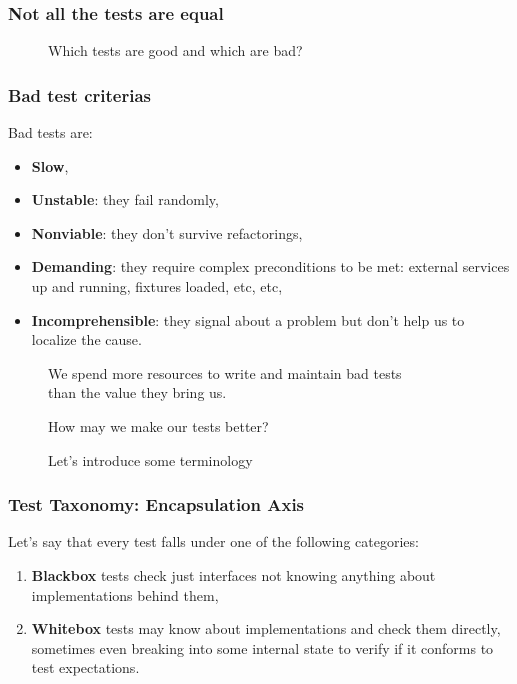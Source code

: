 \documentclass[usenames,dvipsnames,aspectratio=169]{beamer}
\begin{document}
\begin{frame}
  \frametitle{Not all the tests are equal}

  \begin{figure}
  \Huge Which tests are good and which are bad?
  \end{figure}
\end{frame}

\begin{frame}
  \frametitle{Bad test criterias}

  Bad tests are:
  \begin{itemize}
    \item \textbf{Slow},
    \item \textbf{Unstable}: they fail randomly,
    \item \textbf{Nonviable}: they don’t survive refactorings,
    \item \textbf{Demanding}: they require complex preconditions to be met: external services up and running, fixtures loaded, etc, etc,
    \item \textbf{Incomprehensible}: they signal about a problem but don’t help us to localize the cause.
  \end{itemize}
\end{frame}

\begin{frame}
  \begin{figure}
  \Huge We spend more resources to write and maintain bad tests \\
  than the value they bring us.
  \end{figure}
\end{frame}

\begin{frame}
  \begin{figure}
  \Huge How may we make our tests better?
  \end{figure}
\end{frame}

\begin{frame}
  \begin{figure}
  \Huge Let's introduce some terminology
  \end{figure}
\end{frame}

\begin{frame}
  \frametitle{Test Taxonomy: Encapsulation Axis}
  Let's say that every test falls under one of the following categories:

  \begin{enumerate}
    \item \textbf{Blackbox} tests check just interfaces not knowing anything about implementations behind them,
    \item \textbf{Whitebox} tests may know about implementations and check them directly, sometimes even breaking into some internal state to verify if it conforms to test expectations.
  \end{enumerate}
\end{frame}
\end{document}

